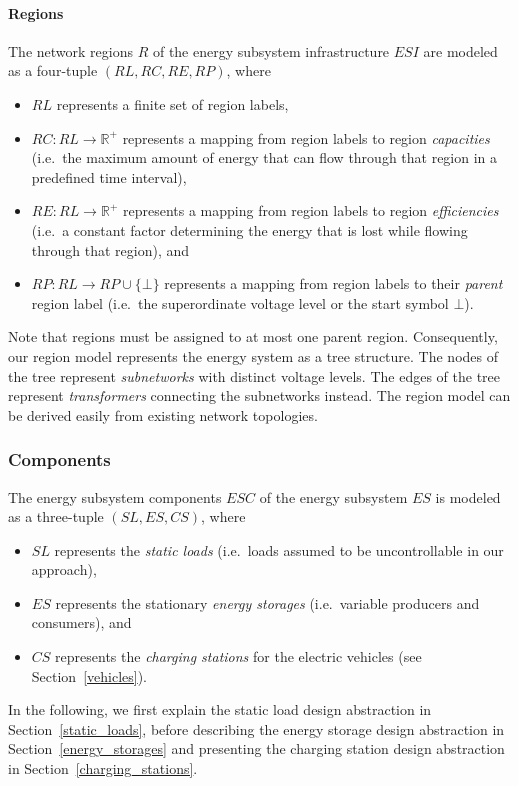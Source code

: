 \paragraph{Regions}
\label{regions}

The network regions $R$ of the energy subsystem infrastructure $ESI$ are modeled as a four-tuple $(RL, RC, RE, RP)$, where
\begin{itemize}
	\item $RL$ represents a finite set of region labels,
	\item $RC: RL \rightarrow \mathbb{R}^+$ represents a mapping from region labels to region \textit{capacities} (i.e.\ the maximum amount of energy that can flow through that region in a predefined time interval),
	\item $RE: RL \rightarrow \mathbb{R}^+$ represents a mapping from region labels to region \textit{efficiencies} (i.e.\ a constant factor determining the energy that is lost while flowing through that region), and
	\item $RP: RL \rightarrow RP \cup \{\bot\}$ represents a mapping from region labels to their \textit{parent} region label (i.e.\ the superordinate voltage level or the start symbol $\bot$).
\end{itemize}
Note that regions must be assigned to at most one parent region. Consequently, our region model represents the energy system as a tree structure. The nodes of the tree represent \textit{subnetworks} with distinct voltage levels. The edges of the tree represent \textit{transformers} connecting the subnetworks instead. The region model can be derived easily from existing network topologies.

\subsubsection{Components}
\label{components}

The energy subsystem components $ESC$ of the energy subsystem $ES$ is modeled as a three-tuple $(SL, ES, CS)$, where
\begin{itemize}
	\item $SL$ represents the \textit{static loads} (i.e.\ loads assumed to be uncontrollable in our approach),
	\item $ES$ represents the stationary \textit{energy storages} (i.e.\ variable producers and consumers), and
	\item $CS$ represents the \textit{charging stations} for the electric vehicles (see Section~\ref{vehicles}).
\end{itemize}
In the following, we first explain the static load design abstraction in Section~\ref{static_loads}, before describing the energy storage design abstraction in Section~\ref{energy_storages} and presenting the charging station design abstraction in Section~\ref{charging_stations}.

